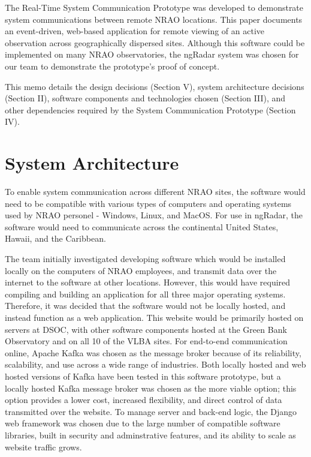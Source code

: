 \documentclass[12pt]{article}
\begin{document}
  The Real-Time System Communication Prototype was developed to demonstrate system communications between remote NRAO locations. This paper documents an event-driven, web-based application for remote viewing of an active observation across geographically dispersed sites. Although this software could be implemented on many NRAO observatories, the ngRadar system was chosen for our team to demonstrate the prototype's proof of concept.

This memo details the design decisions (Section V), system architecture decisions (Section II), software components and technologies chosen (Section III), and other dependencies required by the System Communication Prototype (Section IV).


\section{System Architecture}

  To enable system communication across different NRAO sites, the software would need to be compatible with various types of computers and operating systems used by NRAO personel - Windows, Linux, and MacOS. For use in ngRadar, the software would need to communicate across the continental United States, Hawaii, and the Caribbean. 
    
  The team initially investigated developing software which would be installed locally on the computers of NRAO employees, and transmit data over the internet to the software at other locations. However, this would have required compiling and building an application for all three major operating systems. Therefore, it was decided that the software would not be locally hosted, and instead function as a web application. This website would be primarily hosted on servers at DSOC, with other software components hosted at the Green Bank Observatory and on all 10 of the VLBA sites. For end-to-end communication online, Apache Kafka was chosen as the message broker because of its reliability, scalability, and use across a wide range of industries. Both locally hosted and web hosted versions of Kafka have been tested in this software prototype, but a locally hosted Kafka message broker was chosen as the more viable option; this option provides a lower cost, increased flexibility, and direct control of data transmitted over the website. To manage server and back-end logic, the Django web framework was chosen due to the large number of compatible software libraries, built in security and adminstrative features, and its ability to scale as website traffic grows.
\end{document}
